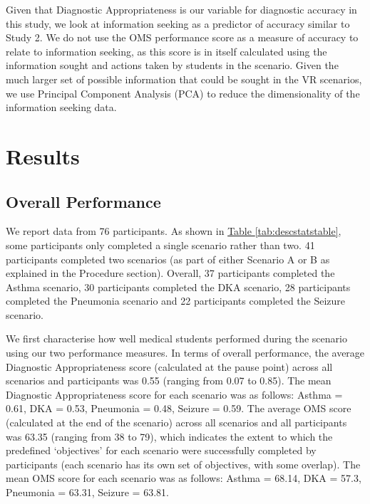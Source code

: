 \documentclass[a4paper, nobind]{templates/ociamthesis}
\begin{document}
\hfill\break
Given that Diagnostic Appropriateness is our variable for diagnostic accuracy in this study, we look at information seeking as a predictor of accuracy similar to Study 2. We do not use the OMS performance score as a measure of accuracy to relate to information seeking, as this score is in itself calculated using the information sought and actions taken by students in the scenario. Given the much larger set of possible information that could be sought in the VR scenarios, we use Principal Component Analysis (PCA) to reduce the dimensionality of the information seeking data.

\section{Results}\label{results-3}

\subsection{Overall Performance}\label{overall-performance}

We report data from 76 participants. As shown in \hyperref[tab:descstatstable]{Table \ref{tab:descstatstable}}, some participants only completed a single scenario rather than two. 41 participants completed two scenarios (as part of either Scenario A or B as explained in the Procedure section). Overall, 37 participants completed the Asthma scenario, 30 participants completed the DKA scenario, 28 participants completed the Pneumonia scenario and 22 participants completed the Seizure scenario.

\hfill\break
We first characterise how well medical students performed during the scenario using our two performance measures. In terms of overall performance, the average Diagnostic Appropriateness score (calculated at the pause point) across all scenarios and participants was 0.55 (ranging from 0.07 to 0.85). The mean Diagnostic Appropriateness score for each scenario was as follows: Asthma = 0.61, DKA = 0.53, Pneumonia = 0.48, Seizure = 0.59. The average OMS score (calculated at the end of the scenario) across all scenarios and all participants was 63.35 (ranging from 38 to 79), which indicates the extent to which the predefined `objectives' for each scenario were successfully completed by participants (each scenario has its own set of objectives, with some overlap). The mean OMS score for each scenario was as follows: Asthma = 68.14, DKA = 57.3, Pneumonia = 63.31, Seizure = 63.81.
\end{document}
